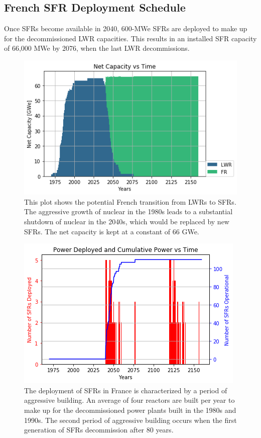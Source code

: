\subsection{French \gls{SFR} Deployment Schedule}

Once \glspl{SFR} become available in 2040,
600-MWe \glspl{SFR} are deployed to make up for the 
decommissioned \gls{LWR} capacities. 
This results in an installed \gls{SFR} capacity of 66,000 MWe
 by 2076, when the last \gls{LWR} decommissions.

\begin{figure}[htbp!]
        \begin{center}
                \includegraphics[scale=0.6]{./images/french-transition/power_plot.png}
        \end{center}
        \caption{This plot shows the potential French transition from \glspl{LWR} to \glspl{SFR}.
				 The aggressive growth of nuclear in the 1980s leads to a substantial shutdown
				 of nuclear in the 2040s, which would be replaced by new \glspl{SFR}. The net
				 capacity is kept at a constant of 66 GWe.}
        \label{fig:sfr_num}
\end{figure}
\begin{figure}[htbp!]
	\begin{center}
		\includegraphics[scale=0.6]{./images/french-transition/sfr_deploy.png}
	\end{center}
	\caption{The deployment of \glspl{SFR} in France is characterized by a period of
		     aggressive building. An average of four reactors are built per year to
		     make up for the decommissioned power plants built in the 1980s and 1990s.
		     The second period of aggressive building occurs when the first generation
		     of \glspl{SFR} decommission after 80 years.}
	\label{fig:dep}
\end{figure}
\FloatBarrier


